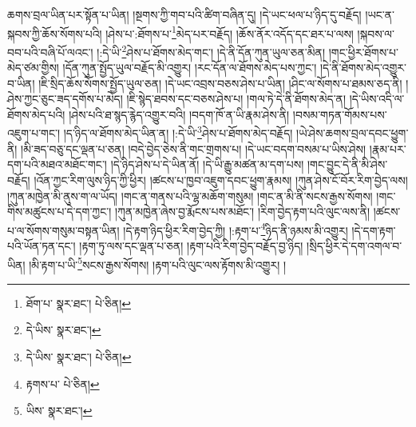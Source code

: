 ཆགས་བྲལ་ཡིན་པར་སྟོན་པ་ཡིན། །སྔགས་ཀྱི་གབ་པའི་ཚིག་བཞིན་དུ། །དེ་ཡང་ཕལ་པ་ཉིད་དུ་བརྗོད། །ཡང་ན་སྐབས་ཀྱི་ཆོས་སོགས་པའི། །ཤེས་པ་:ཐོགས་པ་\footnote{ཐོག་པ་  སྣར་ཐང་།  པེ་ཅིན། }མེད་པར་བརྗོད། །ཆོས་ནོར་འདོད་དང་ཐར་པ་ལས། །སྐབས་ལ་བབ་པའི་བཞི་པོ་ལའང་། །:དེ་ཡི་\footnote{དེ་ཡིས་  སྣར་ཐང་། }ཤེས་པ་ཐོགས་མེད་གང་། །དེ་ནི་དོན་ཀུན་ཡུལ་ཅན་མིན། །གང་ཕྱིར་ཐོགས་པ་མེད་ཙམ་གྱིས། །དོན་ཀུན་སྤྱོད་ཡུལ་བརྗོད་མི་འགྱུར། །རང་དོན་ལ་ཐོགས་མེད་པས་ཀྱང་། །དེ་ནི་ཐོགས་མེད་འགྱུར་བ་ཡིན། །ཇི་སྲིད་ཆོས་སོགས་སྤྱོད་ཡུལ་ཅན། །དེ་ཡང་འབྲས་བཅས་ཤེས་པ་ཡིན། །ཤིང་ལ་སོགས་པ་ཐམས་ཅད་ནི། །ཤེས་ཀྱང་ཅུང་ཟད་དགོས་པ་མེད། །ཇི་སྙེད་ཐབས་དང་བཅས་ཤེས་པ། །གལ་ཏེ་དེ་ནི་ཐོགས་མེད་ན། །དེ་ཡིས་འདི་ལ་ཐོགས་མེད་པའི། །ཤེས་པའི་ཐ་སྙད་རྙེད་འགྱུར་བའི། །བདག་ཁོ་ན་ཡི་རྣམ་ཤེས་ནི། །བསམ་གཏན་གོམས་པས་འཇུག་པ་གང་། །ད་ཉིད་ལ་ཐོགས་མེད་ཡིན་ན། །:དེ་ཡི་\footnote{དེ་ཡིས་  སྣར་ཐང་།  པེ་ཅིན། }ཤེས་པ་ཐོགས་མེད་བརྗོད། །ཡེ་ཤེས་ཆགས་བྲལ་དབང་ཕྱུག་ནི། །མི་ཟད་བཅུ་དང་ལྡན་པ་ཅན། །བདེ་བྱེད་ཅེས་ནི་གང་གྲགས་པ། །དེ་ཡང་བདག་བསམ་པ་ཡིས་ཤེས། །རྣམ་པར་དག་པའི་མཐའ་མཐོང་གང་། །དེ་ཉིད་ཤེས་པ་དེ་ཡིན་ནོ། །དེ་ཡི་རྒྱུ་མཚན་མ་དག་པས། །གང་བྱུང་དེ་ནི་མི་ཤེས་བརྗོད། །འོན་ཀྱང་རིག་ལུས་ཉིད་ཀྱི་ཕྱིར། །ཚངས་པ་ཁྱབ་འཇུག་དབང་ཕྱུག་རྣམས། །ཀུན་ཤེས་ངོ་བོར་རིག་བྱེད་ལས། །ཀུན་མཁྱེན་མི་ནུས་ག་ལ་ཡོད། །གང་ན་གནས་པའི་ལྷ་མཆོག་གསུམ། །གང་ན་མི་ནི་སངས་རྒྱས་སོགས། །གང་གིས་མཚུངས་པ་དེ་དག་ཀྱང་། །ཀུན་མཁྱེན་ཞེས་བྱ་རྨོངས་པས་མཐོང་། །རིག་བྱེད་རྟག་པའི་ལུང་ལས་ནི། །ཚངས་པ་ལ་སོགས་གསུམ་བསྟན་ཡིན། །དེ་རྟག་ཉིད་ཕྱིར་རིག་བྱེད་ཀྱི། །:རྟག་པ་\footnote{རྟགས་པ་  པེ་ཅིན། }ཉིད་ནི་ཉམས་མི་འགྱུར། །དེ་དག་རྟག་པའི་ཡོན་ཏན་དང་། །རྟག་ཏུ་ལས་དང་ལྡན་པ་ཅན། །རྟག་པའི་རིག་བྱེད་བརྗོད་བྱ་ཉིད། །སྲིད་ཕྱིར་དེ་དག་འགལ་བ་ཡིན། །མི་རྟག་པ་ཡི་\footnote{ཡིས་  སྣར་ཐང་། }སངས་རྒྱས་སོགས། །རྟག་པའི་ལུང་ལས་རྟོགས་མི་འགྱུར། །
